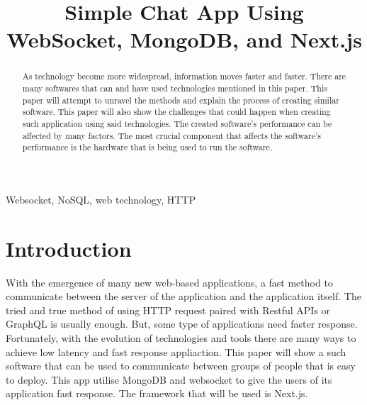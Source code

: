 \documentclass[conference]{IEEEtran}
\begin{document}
\title{Simple Chat App Using WebSocket, MongoDB, and Next.js\\
}

\author{
}

\maketitle

\begin{abstract}
As technology become more widespread, information moves faster and faster. There are
many softwares that can and have used technologies mentioned in this paper. This paper
will attempt to unravel the methods and explain the process of creating similar
software. This paper will also show the challenges that could happen when creating
such application using said technologies. The created software's performance can be
affected by many factors. The most crucial component that affects the software's
performance is the hardware that is being used to run the software.
\end{abstract}

\begin{IEEEkeywords}
Websocket, NoSQL, web technology, HTTP
\end{IEEEkeywords}

\section{Introduction}
With the emergence of many new web-based applications, a fast method to
communicate between the server of the application and the application itself. The
tried and true method of using HTTP request paired with Restful APIs or GraphQL is
usually enough. But, some type of applications need faster response. Fortunately,
with the evolution of technologies and tools there are many ways to achieve low
latency and fast response appliaction. This paper will show a such software that can
be used to communicate between groups of people that is easy to deploy. This app utilise
MongoDB and websocket to give the users of its application fast response. The framework
that will be used is Next.js.
\end{document}
